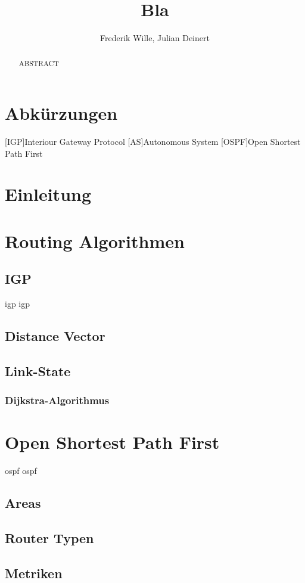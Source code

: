 \documentclass[1pt,a4paper,final]{article}
\title{\LARGE \bf
Bla
}
\author{Frederik Wille, Julian Deinert}
\date{}
\begin{document}

\maketitle
\thispagestyle{empty}
\newpage
\thispagestyle{empty}
\tableofcontents
\newpage
\setcounter{page}{1}

\section*{Abkürzungen}
\begin{acronym}
		[IGP]{Interiour Gateway Protocol}
		[AS]{Autonomous System}
		{Open Shortest Path First}
\end{acronym}
\newpage
\begin{abstract}
ABSTRACT

\end{abstract}

\section{Einleitung}
\section{Routing Algorithmen}
\subsection{IGP}
\ac{igp} \ac{igp}
\subsection{Distance Vector}
\subsection{Link-State}
\subsubsection{Dijkstra-Algorithmus}
\section{Open Shortest Path First}
\ac{ospf} \ac{ospf}
\subsection{Areas}
\subsection{Router Typen}
\subsection{Metriken}
\end{document}
